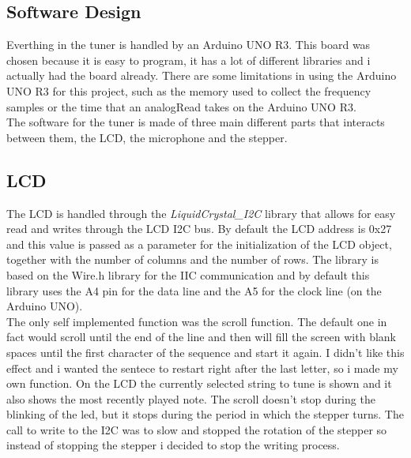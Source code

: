 \documentclass[a4paper,12pt]{article}
\begin{document}
\begin{multicols}{2}
\section{Software Design}
Everthing in the tuner is handled by an Arduino UNO R3. This board was chosen because it is easy to program, it has a lot of different libraries and i actually had the board already. There are some limitations in using the Arduino UNO R3 for this project, such as the memory used to collect the frequency samples or the time that an analogRead takes on the Arduino UNO R3.\\
The software for the tuner is made of three main different parts that interacts between them, the LCD, the microphone and the stepper.\\
\subsection{LCD}
The LCD is handled through the \textit{LiquidCrystal\_I2C} library that allows for easy read and writes through the LCD I2C bus. By default the LCD address is 0x27 and this value is passed as a parameter for the initialization of the LCD object, together with the number of columns and the number of rows. The library is based on the Wire.h library for the IIC communication and by default this library uses the A4 pin for the data line and the A5 for the clock line (on the Arduino UNO).\\
The only self implemented function was the scroll function. The default one in fact would scroll until the end of the line and then will fill the screen with blank spaces until the first character of the sequence and start it again. I didn't like this effect and i wanted the sentece to restart right after the last letter, so i made my own function. On the LCD the currently selected string to tune is shown and it also shows the most recently played note. The scroll doesn't stop during the blinking of the led, but it stops during the period in which the stepper turns. The call to write to the I2C was to slow and stopped the rotation of the stepper so instead of stopping the stepper i decided to stop the writing process.


\end{multicols}
\end{document}
